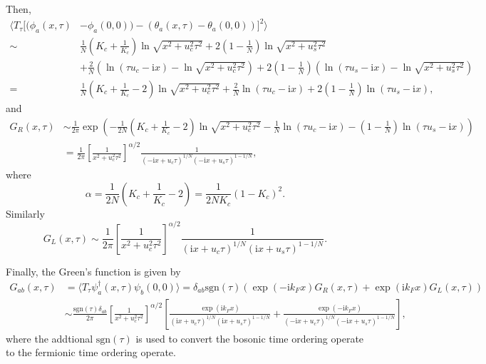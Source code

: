 \documentclass[10pt]{extarticle}
\newcommand{\ii}{\mathrm{i}}
\begin{document}
Then, 
\[
\begin{aligned}
\biggl\langle T_\tau \bigl[(\phi_a(x,\tau)&-\phi_a(0,0))-(\theta_a(x,\tau)-\theta_a(0,0))\bigr]^2\biggr\rangle\\
\sim &\frac{1}{N}\left(K_c+\frac{1}{K_c}\right) \ln \sqrt{x^2+u_c^2\tau^2}+2\left(1-\frac{1}{N}\right) \ln \sqrt{x^2+u_s^2\tau^2}\\
&+\frac{2}{N}\left(\ln (\tau u_c-\ii x)-\ln \sqrt{x^2+u_c^2\tau^2}\right)+2\left(1-\frac{1}{N}\right)\left(\ln (\tau u_s-\ii x)-\ln \sqrt{x^2+u_s^2\tau^2}\right)\\
=&\frac{1}{N}\left(K_c+\frac{1}{K_c}-2\right) \ln \sqrt{x^2+u_c^2\tau^2}+\frac{2}{N}\ln (\tau u_c-\ii x)+2\left(1-\frac{1}{N}\right)\ln (\tau u_s-\ii x),
\end{aligned}
\]
and
\[
\begin{aligned}
	G_R(x,\tau)&\sim\frac{1}{2\pi}\exp\left(-\frac{1}{2N}\left(K_c+\frac{1}{K_c}-2\right) \ln \sqrt{x^2+u_c^2\tau^2}-\frac{1}{N}\ln (\tau u_c-\ii x)-\left(1-\frac{1}{N}\right)\ln (\tau u_s-\ii x)\right)\\
	&=\frac{1}{2\pi}\left[\frac{1}{x^2+u_c^2\tau^2}\right]^{\alpha/2}\frac{1}{(-\ii x+u_c\tau)^{1/N}(-\ii x+u_s\tau)^{1-1/N}},
\end{aligned}
\]
where
\[
	\alpha=\frac{1}{2N}\left(K_c+\frac{1}{K_c}-2\right)=\frac{1}{2NK_c}(1-K_c)^2.
\]
Similarly
\[
	G_L(x,\tau)\sim \frac{1}{2\pi}\left[\frac{1}{x^2+u_c^2\tau^2}\right]^{\alpha/2}\frac{1}{(\ii x+u_c\tau)^{1/N}(\ii x+u_s\tau)^{1-1/N}}.
\]

Finally, the Green's function is given by
\[
\begin{aligned}
	G_{ab}(x,\tau)&=\langle T_\tau \psi_a^\dag(x,\tau)\psi_b(0,0)\rangle=\delta_{ab}\mathrm{sgn}(\tau)\left(\exp(-\ii k_Fx)G_R(x,\tau)+\exp(\ii k_Fx)G_L(x,\tau)\right)\\
	&\sim \frac{\mathrm{sgn}(\tau)\delta_{ab}}{2\pi}\left[\frac{1}{x^2+u_c^2\tau^2}\right]^{\alpha/2}\left[\frac{\exp(\ii k_F x)}{(\ii x+u_c\tau)^{1/N}(\ii x+u_s\tau)^{1-1/N}}+\frac{\exp(-\ii k_F x)}{(-\ii x+u_c\tau)^{1/N}(-\ii x+u_s\tau)^{1-1/N}}\right],
\end{aligned}
\]
where the addtional $\mathrm{sgn}(\tau)$ is used to convert the bosonic time ordering operate to the fermionic time ordering operate.
\end{document}
